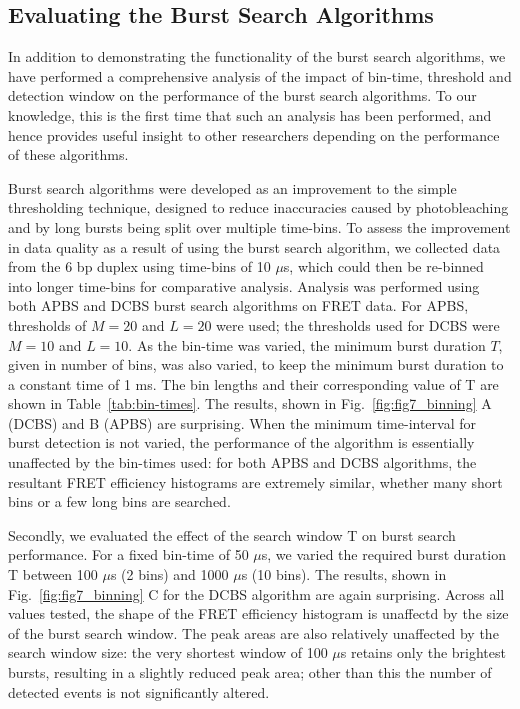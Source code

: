 \documentclass[10pt]{article}
\begin{document}
\subsection*{Evaluating the Burst Search Algorithms}
In addition to demonstrating the functionality of the burst search algorithms, we have performed a comprehensive analysis of the impact of bin-time, threshold and detection window on the performance of the burst search algorithms. To our knowledge, this is the first time that such an analysis has been performed, and hence provides useful insight to other researchers depending on the performance of these algorithms.

Burst search algorithms were developed as an improvement to the simple thresholding technique, designed to reduce inaccuracies caused by photobleaching and by long bursts being split over multiple time-bins. To assess the improvement in data quality as a result of using the burst search algorithm, we collected data from the 6 bp duplex using time-bins of 10 $\mu$s, which could then be re-binned into longer time-bins for comparative analysis. Analysis was performed using both APBS and DCBS burst search algorithms on FRET data. For APBS, thresholds of $M=20$ and $L=20$ were used; the thresholds used for DCBS were $M = 10$ and $L = 10$. As the bin-time was varied, the minimum burst duration $T$, given in number of bins, was also varied, to keep the minimum burst duration to a constant time of 1 ms. The bin lengths and their corresponding value of T are shown in Table~\ref{tab:bin-times}. The results, shown in Fig.~\ref{fig:fig7_binning} A (DCBS) and B (APBS) are surprising. When the minimum time-interval for burst detection is not varied, the performance of the algorithm is essentially unaffected by the bin-times used: for both APBS and DCBS algorithms, the resultant FRET efficiency histograms are extremely similar, whether many short bins or a few long bins are searched.

Secondly, we evaluated the effect of the search window T on burst search performance. For a fixed bin-time of 50 $\mu$s, we varied the required burst duration T between 100 $\mu$s (2 bins) and 1000 $\mu$s (10 bins). The results, shown in Fig.~\ref{fig:fig7_binning} C for the DCBS algorithm are again surprising. Across all values tested, the shape of the FRET efficiency histogram is unaffectd by the size of the burst search window. The peak areas are also relatively unaffected by the search window size: the very shortest window of 100 $\mu$s retains only the brightest bursts, resulting in a slightly reduced peak area; other than this the number of detected events is not significantly altered.
\end{document}
